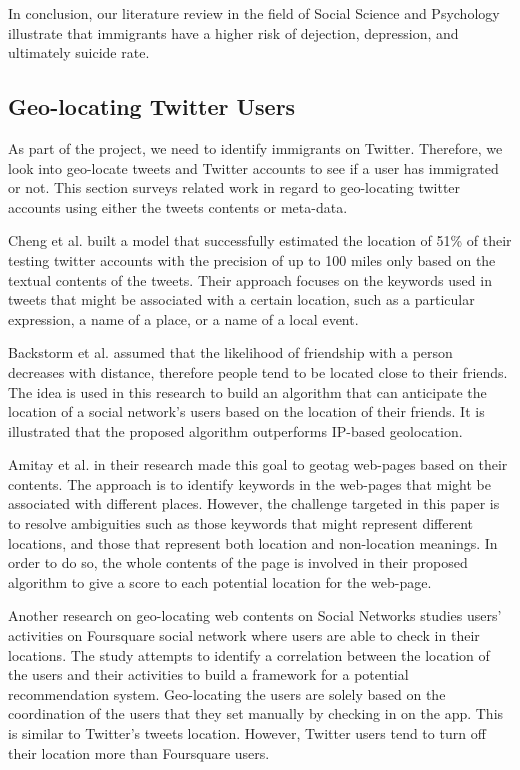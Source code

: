 \documentclass{article}
\begin{document}
In conclusion, our literature review in the field of Social Science and Psychology illustrate that immigrants have a higher risk of dejection, depression, and ultimately suicide rate. 

\subsection{Geo-locating Twitter Users}

As part of the project, we need to identify immigrants on Twitter. Therefore, we look into geo-locate tweets and Twitter accounts to see if a user has immigrated or not. This section surveys related work in regard to geo-locating twitter accounts using either the tweets contents or meta-data. 

Cheng et al. \cite{ref7} built a model that successfully estimated the location of 51\% of their testing twitter accounts with the precision of up to 100 miles only based on the textual contents of the tweets. Their approach focuses on the keywords used in tweets that might be associated with a certain location, such as a particular expression, a name of a place, or a name of a local event.

Backstorm et al. \cite{ref8} assumed that the likelihood of friendship with a person decreases with distance, therefore people tend to be located close to their friends. The idea is used in this research to build an algorithm that can anticipate the location of a social network's users based on the location of their friends. It is illustrated that the proposed algorithm outperforms IP-based geolocation.

Amitay et al. \cite{ref9} in their research made this goal to geotag web-pages based on their contents. The approach is to identify keywords in the web-pages that might be associated with different places. However, the challenge targeted in this paper is to resolve ambiguities such as those keywords that might represent different locations, and those that represent both location and non-location meanings. In order to do so, the whole contents of the page is involved in their proposed algorithm to give a score to each potential location for the web-page.

Another research \cite{ref10} on geo-locating web contents on Social Networks studies users’ activities on Foursquare social network where users are able to check in their locations. The study attempts to identify a correlation between the location of the users and their activities to build a framework for a potential recommendation system. Geo-locating the users are solely based on the coordination of the users that they set manually by checking in on the app. This is similar to Twitter’s tweets location. However, Twitter users tend to turn off their location more than Foursquare users.
\end{document}
